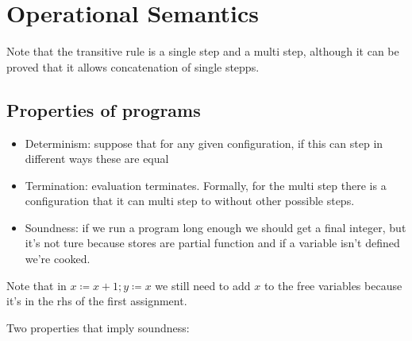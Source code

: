 % 
\chapter{Operational Semantics}

Note that the transitive rule is a single step and a multi step, although it can be proved that it allows concatenation of single stepps.

\section{Properties of programs}
\begin{itemize}
\item Determinism: suppose that for any given configuration, if this can step in different ways these are equal
  \item Termination: evaluation terminates. Formally, for the multi step there is a configuration that it can multi step to without other possible steps.
    \item Soundness: if we run a program long enough we should get a final integer, but it's not ture because stores are partial function and if a variable isn't defined we're cooked.
\end{itemize}



Note that in $ x \coloneq x + 1; y \coloneq x $ we still need to add $ x $ to the free variables because it's in the rhs of the first assignment. 


Two properties that imply soundness:


